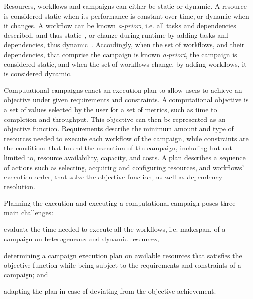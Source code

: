 Resources, workflows and campaigns can either be static or dynamic. A resource 
is considered static when its performance is constant over time, or dynamic when 
it changes. A workflow can be known \textit{a-priori}, i.e. all tasks and 
dependencies described, and thus static~\cite{paraskevakos2019workflow}, or 
change during runtime by adding tasks and dependencies, thus dynamic~\cite{dakka2018high}. 
Accordingly, when the set of workflows, and their dependencies, that comprise 
the campaign is known \textit{a-priori}, the campaign is considered static, and 
when the set of workflows change, by adding workflows, it is considered dynamic.

Computational campaigns enact an execution plan to allow users to achieve an 
objective under given requirements and constraints. A computational objective is 
a set of values selected by the user for a set of metrics, such as time to 
completion and throughput. This objective can then be represented as an objective 
function. Requirements describe the minimum amount and type of resources needed 
to execute each workflow of the campaign, while constraints are the conditions 
that bound the execution of the campaign, including but not limited to, resource 
availability, capacity, and costs. A plan describes a sequence of actions such 
as selecting, acquiring and configuring resources, and workflows' execution order, 
that solve the objective function, as well as dependency resolution.

Planning the execution and executing a computational campaign poses three main 
challenges: 
\begin{inparaenum}[(i)]
\item evaluate the time needed to execute all the workflows, i.e. makespan, of 
a campaign on heterogeneous and dynamic resources;
\item determining a campaign execution plan on available resources that 
satisfies the objective function while being subject to the requirements 
and constraints of a campaign; and
\item adapting the plan in case of deviating from the objective achievement.
\end{inparaenum}

